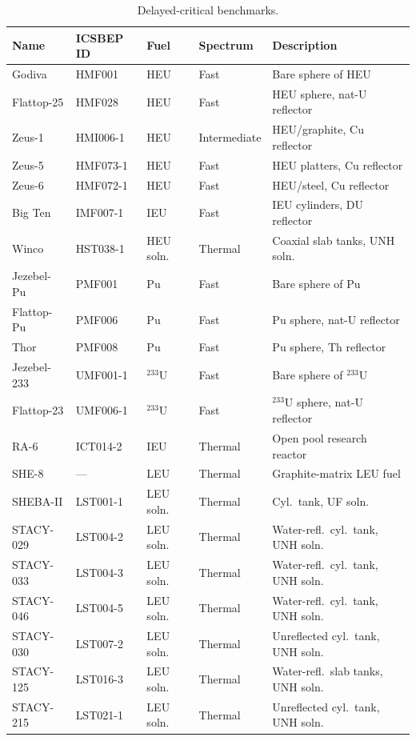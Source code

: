 \documentclass[12pt,preprint]{elsarticle}
\begin{document}
\begin{table}[H]
\centering
\caption{Delayed-critical benchmarks.}
\label{tab:benchmarks}
\footnotesize
\begin{tabular}{@{}lllll@{}}
\toprule
Name & ICSBEP ID & Fuel & Spectrum & Description \\
\midrule
Godiva       & HMF001   & HEU       & Fast         & Bare sphere of HEU \\
Flattop-25   & HMF028   & HEU       & Fast         & HEU sphere, nat-U reflector \\
Zeus-1       & HMI006-1 & HEU       & Intermediate & HEU/graphite, Cu reflector \\
Zeus-5       & HMF073-1 & HEU       & Fast         & HEU platters, Cu reflector \\
Zeus-6       & HMF072-1 & HEU       & Fast         & HEU/steel, Cu reflector \\
Big Ten      & IMF007-1 & IEU       & Fast         & IEU cylinders, DU reflector \\
Winco        & HST038-1 & HEU soln. & Thermal      & Coaxial slab tanks, UNH soln. \\
Jezebel-Pu   & PMF001   & Pu        & Fast         & Bare sphere of Pu \\
Flattop-Pu   & PMF006   & Pu        & Fast         & Pu sphere, nat-U reflector \\
Thor         & PMF008   & Pu        & Fast         & Pu sphere, Th reflector \\
Jezebel-233  & UMF001-1 & $^{233}$U & Fast         & Bare sphere of $^{233}$U \\
Flattop-23   & UMF006-1 & $^{233}$U & Fast         & $^{233}$U sphere, nat-U reflector \\
RA-6         & ICT014-2 & IEU       & Thermal      & Open pool research reactor \\
SHE-8        & ---      & LEU       & Thermal      & Graphite-matrix LEU fuel \\
SHEBA-II     & LST001-1 & LEU soln. & Thermal      & Cyl.\ tank, UF soln. \\
STACY-029    & LST004-2 & LEU soln. & Thermal      & Water-refl.\ cyl.\ tank, UNH soln. \\
STACY-033    & LST004-3 & LEU soln. & Thermal      & Water-refl.\ cyl.\ tank, UNH soln. \\
STACY-046    & LST004-5 & LEU soln. & Thermal      & Water-refl.\ cyl.\ tank, UNH soln. \\
STACY-030    & LST007-2 & LEU soln. & Thermal      & Unreflected cyl.\ tank, UNH soln. \\
STACY-125    & LST016-3 & LEU soln. & Thermal      & Water-refl.\ slab tanks, UNH soln. \\
STACY-215    & LST021-1 & LEU soln. & Thermal      & Unreflected cyl.\ tank, UNH soln. \\
\bottomrule
\end{tabular}
\end{table}
\end{document}
